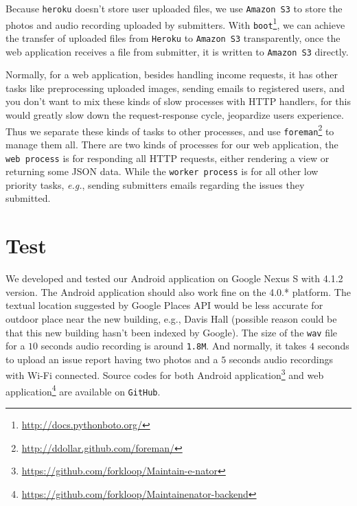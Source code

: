 \documentclass{acm_proc_article-sp}
\begin{document}
Because \texttt{heroku} doesn't store user uploaded files, we use \texttt{Amazon S3} to store the photos and audio recording uploaded by submitters.
With \texttt{boot}\footnote{\url{http://docs.pythonboto.org/}}, we can achieve the transfer of uploaded files from \texttt{Heroku} to \texttt{Amazon S3}
transparently, once the web application receives a file from submitter, it is written to \texttt{Amazon S3} directly.

Normally, for a web application, besides handling income requests, it has other tasks like preprocessing uploaded images, sending emails to registered users,
and you don't want to mix these kinds of slow processes with HTTP handlers, for this would greatly slow down the request-response cycle, jeopardize users
experience. Thus we separate these kinds of tasks to other processes,
and use \texttt{foreman}\footnote{\url{http://ddollar.github.com/foreman/}} to manage them all.
There are two kinds of processes for our web application, the \texttt{web process} is for responding all HTTP requests, either rendering a view or
returning some JSON data. While the \texttt{worker process} is for all other low priority tasks, \textit{e.g.}, sending submitters emails regarding the issues they
submitted.

\newpage
\section{Test}
We developed and tested our Android application on Google Nexus S with 4.1.2 version. The Android application should also work fine on the
4.0.* platform. The textual location suggested by Google Places API would be less accurate for outdoor place near the new building, e.g., Davis Hall
(possible reason could be that this new building hasn't been indexed by Google).
The size of the \texttt{wav} file for a $10$ seconds audio recording is around \texttt{1.8M}.
And normally, it takes $4$ seconds to upload an issue report having two photos and a $5$ seconds audio recordings with Wi-Fi connected.
Source codes for both Android application\footnote{\url{https://github.com/forkloop/Maintain-e-nator}} and
web application\footnote{\url{https://github.com/forkloop/Maintainenator-backend}} are available on \texttt{GitHub}.

\end{document}
